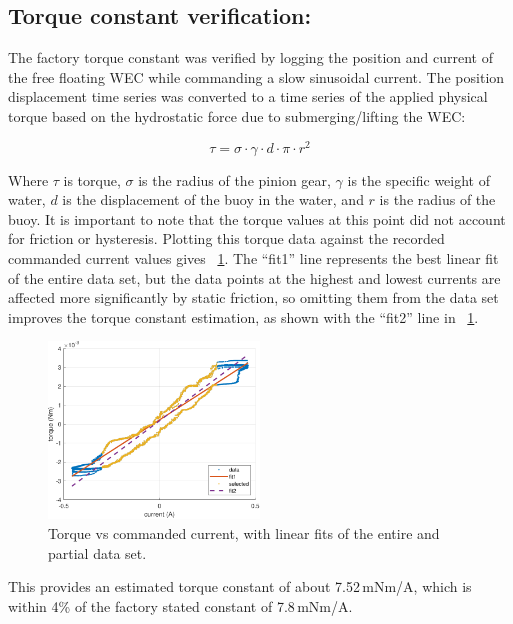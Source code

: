 \documentclass[11pt, letterpaper]{article}
\begin{document}
\subsection{Torque constant verification:}  \label{tConstSec}
The factory torque constant was verified by logging the position and current of the free floating WEC while commanding a slow sinusoidal current.
The position displacement time series was converted to a time series of the applied physical torque based on the hydrostatic force due to submerging/lifting the WEC:

\begin{equation}
  \tau = \sigma \cdot \gamma \cdot d \cdot \pi \cdot r^2
\end{equation}

Where $\tau$ is torque, $\sigma$ is the radius of the pinion gear, $\gamma$ is the specific weight of water, $d$ is the displacement of the buoy in the water, and $r$ is the radius of the buoy.
It is important to note that the torque values at this point did not account for friction or hysteresis.
Plotting this torque data against the recorded commanded current values gives  \figurename~\ref{fig:TorqueConstant}.
The ``fit1'' line represents the best linear fit of the entire data set, but the data points at the highest and lowest currents are affected more significantly by static friction, so omitting them from the data set improves the torque constant estimation, as shown with the ``fit2'' line in \figurename~\ref{fig:TorqueConstant}.
\begin{figure}[tb]
  \centering
  \includegraphics[width=0.5\textwidth]{diagrams/TorqueConstant.pdf}
  \caption{Torque vs commanded current, with linear fits of the entire and partial data set.}
  \label{fig:TorqueConstant}
\end{figure}
This provides an estimated torque constant of about 7.52\,mNm/A, which is within 4\% of the factory stated constant of 7.8\,mNm/A.
\end{document}
